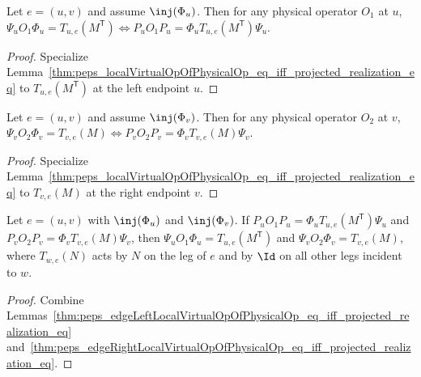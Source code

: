 \begin{lemma}%
    \label{thm:peps_edgeLeftLocalVirtualOpOfPhysicalOp_eq_iff_projected_realization_eq}
    \leanok
    Let $e=(u,v)$ and assume $\inj(\Phi_u)$. Then for any physical operator $O_1$
    at $u$,
    $\Psi_uO_1\Phi_u=T_{u,e}(M^{\mathsf T})\iff P_uO_1P_u=\Phi_uT_{u,e}(M^{\mathsf T})\Psi_u$.
\end{lemma}
\begin{proof}\leanok
    Specialize Lemma~\ref{thm:peps_localVirtualOpOfPhysicalOp_eq_iff_projected_realization_eq}
    to $T_{u,e}(M^{\mathsf T})$ at the left endpoint $u$.
\end{proof}

\begin{lemma}%
    \label{thm:peps_edgeRightLocalVirtualOpOfPhysicalOp_eq_iff_projected_realization_eq}
    \leanok
    Let $e=(u,v)$ and assume $\inj(\Phi_v)$. Then for any physical operator $O_2$
    at $v$,
    $\Psi_vO_2\Phi_v=T_{v,e}(M)\iff P_vO_2P_v=\Phi_vT_{v,e}(M)\Psi_v$.
\end{lemma}
\begin{proof}\leanok
    Specialize Lemma~\ref{thm:peps_localVirtualOpOfPhysicalOp_eq_iff_projected_realization_eq}
    to $T_{v,e}(M)$ at the right endpoint $v$.
\end{proof}

\begin{lemma}%
    \label{thm:peps_edgeEndpointLocalVirtualOpOfPhysicalOp_eq_of_projected_realization_eq}
    \leanok
    Let $e=(u,v)$ with $\inj(\Phi_u)$ and $\inj(\Phi_v)$. If
    $P_uO_1P_u=\Phi_uT_{u,e}(M^{\mathsf T})\Psi_u$ and
    $P_vO_2P_v=\Phi_vT_{v,e}(M)\Psi_v$, then
    $\Psi_uO_1\Phi_u=T_{u,e}(M^{\mathsf T})$ and
    $\Psi_vO_2\Phi_v=T_{v,e}(M)$, where $T_{w,e}(N)$ acts by $N$ on the leg of
    $e$ and by $\Id$ on all other legs incident to $w$.
\end{lemma}
\begin{proof}\leanok
    Combine Lemmas~\ref{thm:peps_edgeLeftLocalVirtualOpOfPhysicalOp_eq_iff_projected_realization_eq}
    and~\ref{thm:peps_edgeRightLocalVirtualOpOfPhysicalOp_eq_iff_projected_realization_eq}.
\end{proof}

